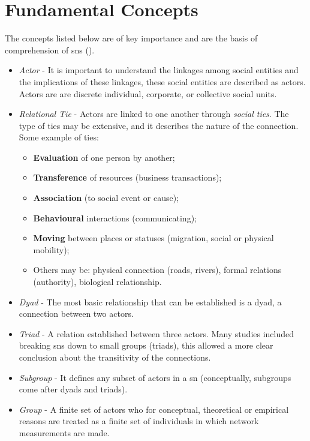 \section{Fundamental Concepts}

The concepts listed below are of key importance and are the basis of comprehension of \glspl{sn} (\cite{wasserman1994social}).

\begin{itemize}
    \item \emph{Actor} - It is important to understand the linkages among social entities and the implications of these linkages, these social entities are described as actors. Actors are are discrete individual, corporate, or collective social units.
    \item \emph{Relational Tie} - Actors are linked to one another through \textit{social ties}. The type of ties may be extensive, and it describes the nature of the connection. Some example of ties:
        \begin{itemize}
            \item \textbf{Evaluation} of one person by another;
            \item \textbf{Transference} of resources (business transactions);
            \item \textbf{Association} (to social event or cause);
            \item \textbf{Behavioural} interactions (communicating);
            \item \textbf{Moving} between places or statuses (migration, social or physical mobility);
            \item Others may be: physical connection (roads, rivers), formal relations (authority), biological relationship.
        \end{itemize}
    \item \emph{Dyad} - The most basic relationship that can be established is a dyad, a connection between two actors.
    \item \emph{Triad} - A relation established between three actors. Many studies included breaking \glspl{sn} down to small groups (triads), this allowed a more clear conclusion about the transitivity of the connections.
    \item \emph{Subgroup} - It defines any subset of actors in a \gls{sn} (conceptually, subgroups come after dyads and triads).
    \item \emph{Group} - A finite set of actors who for conceptual, theoretical or empirical reasons are treated as a finite set of individuals in which network measurements are made.

\end{itemize}
